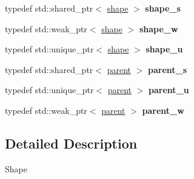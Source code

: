 \begin{DoxyCompactItemize}
\item 
\hypertarget{namespaceNeb_1_1Shape_a931f5b6d2a3c1492b47f2a1de08426ae}{typedef std\-::shared\-\_\-ptr$<$ \hyperlink{classNeb_1_1Shape_1_1shape}{shape} $>$ {\bfseries shape\-\_\-s}}\label{namespaceNeb_1_1Shape_a931f5b6d2a3c1492b47f2a1de08426ae}

\item 
\hypertarget{namespaceNeb_1_1Shape_a25210e2c4ee7127085c0c83be8ab7b83}{typedef std\-::weak\-\_\-ptr$<$ \hyperlink{classNeb_1_1Shape_1_1shape}{shape} $>$ {\bfseries shape\-\_\-w}}\label{namespaceNeb_1_1Shape_a25210e2c4ee7127085c0c83be8ab7b83}

\item 
\hypertarget{namespaceNeb_1_1Shape_a835ddb6133963d3e9ba0837bfc460630}{typedef std\-::unique\-\_\-ptr$<$ \hyperlink{classNeb_1_1Shape_1_1shape}{shape} $>$ {\bfseries shape\-\_\-u}}\label{namespaceNeb_1_1Shape_a835ddb6133963d3e9ba0837bfc460630}

\item 
\hypertarget{namespaceNeb_1_1Shape_af796f0b6fca6942e3953d40753cc0901}{typedef std\-::shared\-\_\-ptr$<$ \hyperlink{classNeb_1_1Shape_1_1parent}{parent} $>$ {\bfseries parent\-\_\-s}}\label{namespaceNeb_1_1Shape_af796f0b6fca6942e3953d40753cc0901}

\item 
\hypertarget{namespaceNeb_1_1Shape_aeaeb7d605080483401b8b02c2e620470}{typedef std\-::unique\-\_\-ptr$<$ \hyperlink{classNeb_1_1Shape_1_1parent}{parent} $>$ {\bfseries parent\-\_\-u}}\label{namespaceNeb_1_1Shape_aeaeb7d605080483401b8b02c2e620470}

\item 
\hypertarget{namespaceNeb_1_1Shape_aabff74f41e23c4acdbc7cca9c51b1d1d}{typedef std\-::weak\-\_\-ptr$<$ \hyperlink{classNeb_1_1Shape_1_1parent}{parent} $>$ {\bfseries parent\-\_\-w}}\label{namespaceNeb_1_1Shape_aabff74f41e23c4acdbc7cca9c51b1d1d}

\end{DoxyCompactItemize}


\subsection{\-Detailed \-Description}
\-Shape 